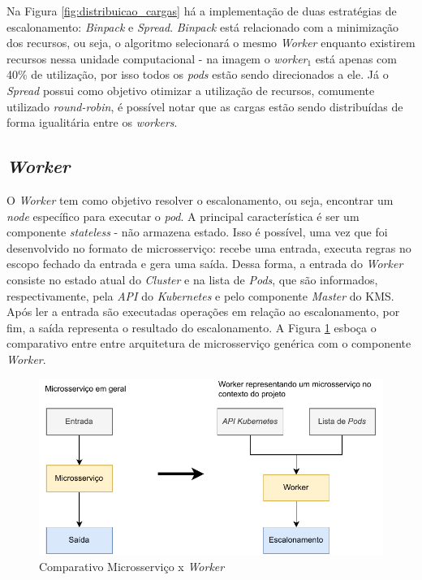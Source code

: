 Na Figura \ref{fig:distribuicao_cargas} há a implementação de duas estratégias de escalonamento: \textit{Binpack} e \textit{Spread}. \textit{Binpack} está relacionado com a minimização dos recursos, ou seja, o algoritmo selecionará o mesmo \textit{Worker} enquanto existirem recursos nessa unidade computacional - na imagem o \textit{worker$_1$} está apenas com 40\% de utilização, por isso todos os \textit{pods} estão sendo direcionados a ele. Já o \textit{Spread} possui como objetivo otimizar a utilização de recursos, comumente utilizado \textit{round-robin}, é possível notar que as cargas estão sendo distribuídas de forma igualitária entre os \textit{workers}.

\subsection{\textit{Worker}}

O \textit{Worker} tem como objetivo resolver o escalonamento, ou seja, encontrar um \textit{node} específico para executar o \textit{pod}. A principal característica é ser um componente \textit{stateless} - não armazena estado. Isso é possível, uma vez que foi desenvolvido no formato de microsserviço: recebe uma entrada, executa regras no escopo fechado da entrada e gera uma saída. Dessa forma, a entrada do \textit{Worker} consiste no estado atual do \textit{Cluster} e na lista de \textit{Pods}, que são informados, respectivamente, pela \textit{API} do \textit{Kubernetes} e pelo componente \textit{Master} do \ac{KMS}. Após ler a entrada são executadas operações em relação ao escalonamento, por fim, a saída representa o resultado do escalonamento. A Figura \ref{fig:microsservico-worker} esboça o comparativo entre entre arquitetura de microsserviço genérica com o componente \textit{Worker}.

\begin{figure}[h!]
	\caption{\label{fig:microsservico-worker} Comparativo Microsserviço x \textit{Worker}}
	\centering
	\includegraphics[width=\linewidth]{assets/microsservico-worker.pdf}
\end{figure}

